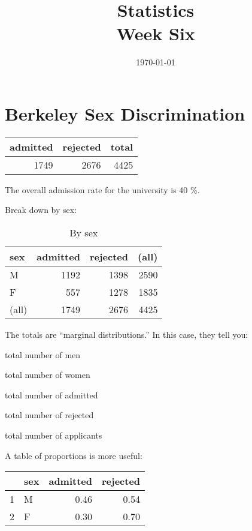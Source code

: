 \documentclass[landscape]{exam}
\title{Statistics \\ Week Six}
\date{\today}
\author{}
\begin{document}
  \maketitle
  \tableofcontents

  \section{Berkeley Sex Discrimination}

  \begin{table}[H]
    \centering
    \begin{tabular}{rrr}
      \toprule
      admitted & rejected & total \\
      \midrule
      1749     & 2676     & 4425 \\
      \bottomrule
    \end{tabular}
  \end{table}

  The overall admission rate for the university is 40 \%.

  Break down by sex:
  \begin{table}[H]
    \centering
    \begin{tabular}{lrrr}
      \toprule
      sex   & admitted & rejected & (all) \\
      \midrule
      M     & 1192     & 1398     & 2590 \\
      F     & 557      & 1278     & 1835 \\
      \midrule
      (all) & 1749     & 2676     & 4425 \\
       \bottomrule
    \end{tabular}
    \caption{By sex}
  \end{table}

  The totals are ``marginal distributions.'' In this case, they tell you:
  \begin{itemize*}
    \item total number of men
    \item total number of women
    \item total number of admitted
    \item total number of rejected
    \item total number of applicants
  \end{itemize*}

  A table of proportions is more useful:
  \begin{table}[H]
    \centering
    \begin{tabular}{rlrr}
      \toprule
                & sex & admitted & rejected \\
      \midrule
      1         & M   & 0.46     & 0.54 \\
      2         & F   & 0.30     & 0.70 \\
       \bottomrule
    \end{tabular}
  \end{table}
\end{document}
